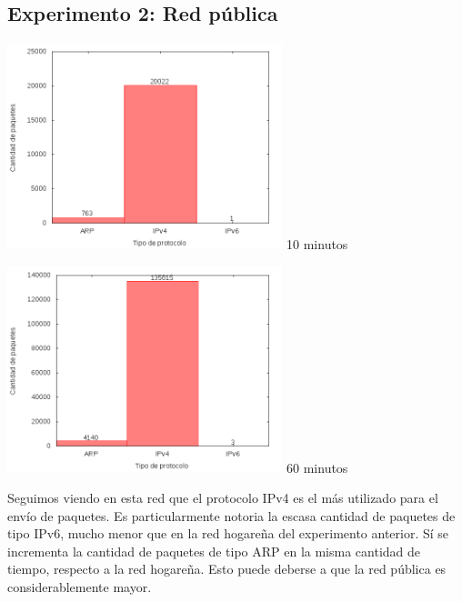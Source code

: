\subsection{Experimento 2: Red pública}

\begin{minipage}{8cm}
  \centering
  \includegraphics[width=8cm]{../mediciones/altop-wifi-10/altop10Protocolos.png}
  10 minutos
\end{minipage}%
\begin{minipage}{8cm}
  \centering
  \includegraphics[width=8cm]{../mediciones/altop-wifi-60/altop60Protocolos.png}
  60 minutos
\end{minipage}


Seguimos viendo en esta red que el protocolo IPv4 es el más utilizado para el envío de paquetes. Es particularmente notoria la escasa
cantidad de paquetes de tipo IPv6, mucho menor que en la red hogareña del experimento anterior. Sí se incrementa la cantidad de paquetes
de tipo ARP en la misma cantidad de tiempo, respecto a la red hogareña. Esto puede deberse a que la red pública es considerablemente mayor.


